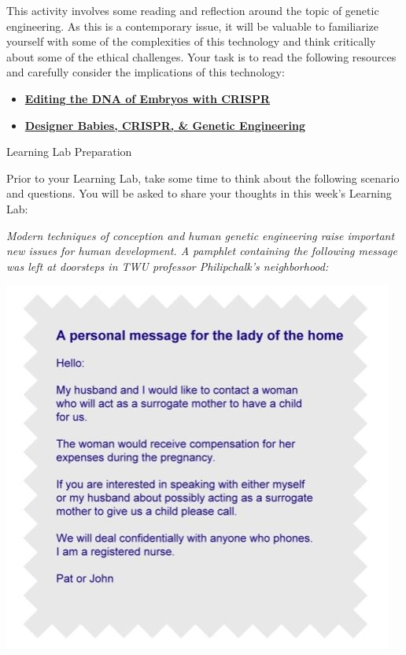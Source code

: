 \documentclass[
]{book}
\providecommand{\tightlist}{%
  \setlength{\itemsep}{0pt}\setlength{\parskip}{0pt}}
\begin{document}
\begin{reflect}
This activity involves some reading and reflection around the topic of genetic engineering. As this is a contemporary issue, it will be valuable to familiarize yourself with some of the complexities of this technology and think critically about some of the ethical challenges. Your task is to read the following resources and carefully consider the implications of this technology:

\begin{itemize}
\tightlist
\item
  \href{https://www.statnews.com/2019/09/16/could-editing-the-dna-of-embryos-with-crispr-help-save-people-who-are-already-alive/}{\textbf{Editing the DNA of Embryos with CRISPR}}\\
\item
  \href{https://www.geneticsandsociety.org/internal-content/designer-babies-crispr-genetic-engineering}{\textbf{Designer Babies, CRISPR, \& Genetic Engineering}}
\end{itemize}

{Learning Lab Preparation}

Prior to your Learning Lab, take some time to think about the following scenario and questions. You will be asked to share your thoughts in this week's Learning Lab:

\emph{Modern techniques of conception and human genetic engineer­ing raise important new issues for human development. A pam­phlet containing the following message was left at doorsteps in TWU professor Philipchalk's neighborhood:}

\includegraphics{assets/unit_3/U3_T1_LearningACtivitity.JPG}


\end{reflect}
\end{document}

